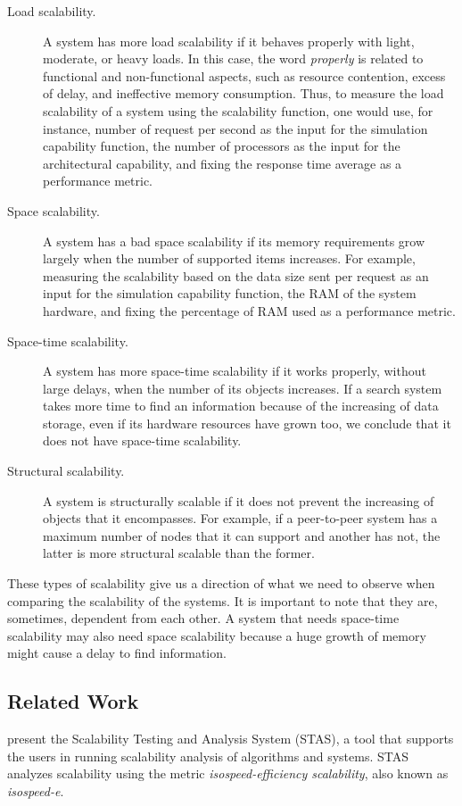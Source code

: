 \begin{description}
\item[Load scalability.] A system has more load scalability if it behaves properly with light, moderate, or heavy loads. In this case, the word \emph{properly} is related to functional and non-functional aspects, such as resource contention, excess of delay, and ineffective memory consumption. Thus, to measure the load scalability of a system using the scalability function, one would use, for instance,  number of request per second as the input for the simulation capability function, the number of processors as the input for the architectural capability, and fixing the response time average as a performance metric.
\item[Space scalability.]  A system has a bad space scalability if its memory requirements grow largely when the number of supported items increases. For example, measuring the scalability based on the data size sent per request as an input for the simulation capability function, the RAM of the system hardware, and fixing the percentage of RAM used as a performance metric.
\item[Space-time scalability.] A system has more space-time scalability if it works properly, without large delays, when the number of its objects increases. If a search system takes more time to find an information because of the increasing of data storage, even if its hardware resources have grown too, we conclude that it does not have space-time scalability.
\item[Structural scalability.] A system is structurally scalable if it does not prevent the increasing of objects that it encompasses. For example, if a peer-to-peer system has a maximum number of nodes that it can support and another has not, the latter is more structural scalable than the former.
\end{description}

These types of scalability give us a direction of what we need to observe when comparing the scalability of the systems. It is important to note that they are, sometimes, dependent from each other. A system that needs space-time scalability may also need space scalability because a huge growth of memory might cause a delay to find information.

\subsection{Related Work}

\cite{STAS} present the Scalability Testing and Analysis System (STAS), a tool that supports the users in running scalability analysis of algorithms and systems. STAS analyzes scalability using the metric \emph{isospeed-efficiency scalability}, also known as \emph{isospeed-e}. 

